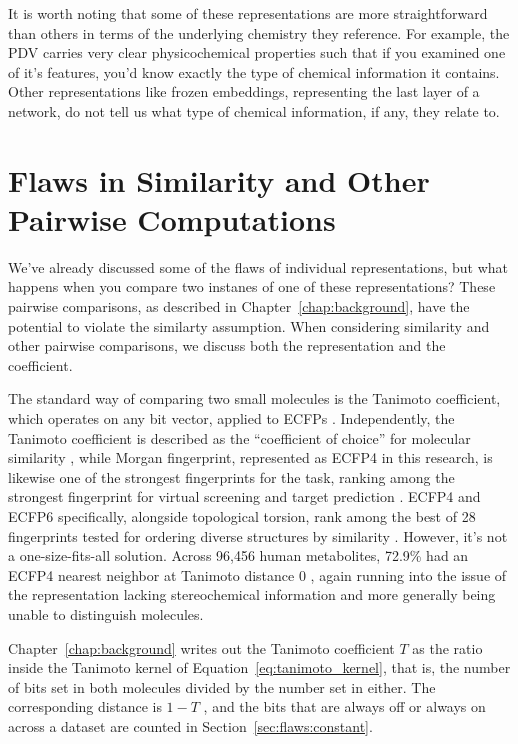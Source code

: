 It is worth noting that some of these representations are more straightforward than others in terms of the underlying chemistry they reference. For example, the PDV carries very clear physicochemical properties such that if you examined one of it's features, you'd know exactly the type of chemical information it contains. Other representations like frozen embeddings, representing the last layer of a network, do not tell us what type of chemical information, if any, they relate to. 


\section{Flaws in Similarity and Other Pairwise Computations}\label{sec:flaws:similarity} %

We've already discussed some of the flaws of individual representations, but what happens when you compare two instanes of one of these representations? These pairwise comparisons, as described in Chapter~\ref{chap:background}, have the potential to violate the similarty assumption. When considering similarity and other pairwise comparisons, we discuss both the representation and the coefficient.  


The standard way of comparing two small molecules is the Tanimoto coefficient, which operates on any bit vector, applied to ECFPs \citep{LopezPerez2024}. Independently, the Tanimoto coefficient is described as the ``coefficient of choice'' for molecular similarity \citep{Bajusz2015}, while Morgan fingerprint, represented as ECFP4 in this research, is likewise one of the strongest fingerprints for the task, ranking among the strongest fingerprint for virtual screening and target prediction \citep{Capecchi2020}. ECFP4 and ECFP6 specifically, alongside topological torsion, rank among the best of 28 fingerprints tested for ordering diverse structures by similarity \citep{OBoyle2016}. However, it's not a one-size-fits-all solution. Across 96,456 human metabolites, 72.9\% had an ECFP4 nearest neighbor at Tanimoto distance 0 \citep{Capecchi2020}, again running into the issue of the representation lacking stereochemical information and more generally being unable to distinguish molecules. 

Chapter~\ref{chap:background} writes out the Tanimoto coefficient $T$ as the ratio inside the Tanimoto kernel of Equation~\ref{eq:tanimoto_kernel}, that is, the number of bits set in both molecules divided by the number set in either. The corresponding distance is $1-T$ \citep{Bajusz2015}, and the bits that are always off or always on across a dataset are counted in Section~\ref{sec:flaws:constant}.


